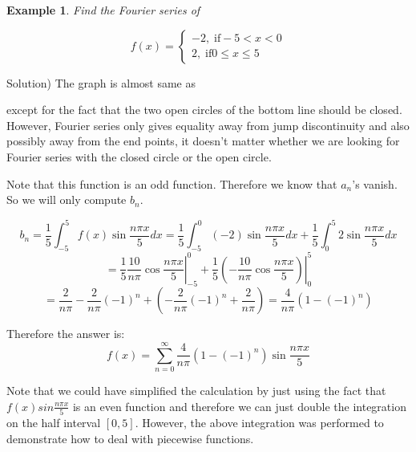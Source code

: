 \documentclass[12pt]{report}
\newtheorem{ex}{Example}[section]
\begin{document}
\begin{ex}
	Find the Fourier series of 
\end{ex}
	$$f(x) = \begin{cases} -2, \; \mathrm{ if } -5<x<0 \\ 2 , \; \mathrm{ if } 0\leq x \leq 5 \end{cases} $$

Solution)
The graph is almost same as
\begin{center}  \end{center}
except for the fact that the two open circles of the bottom line should be closed. However, Fourier series only gives equality away from jump discontinuity and also possibly away from the end points, it doesn't matter whether we are looking for Fourier series with the closed circle or the open circle. 

Note that this function is an odd function. Therefore we know that $a_n$'s vanish. So we will only compute $b_n$.

$$b_n = \frac{1}{5} \int_{-5}^{5} f(x) \sin \frac{n\pi x }{5} dx = \frac{1}{5} \int_{-5}^{0} (-2) \sin \frac{n\pi x }{5} dx + \frac{1}{5} \int_{0}^{5} 2 \sin \frac{n\pi x }{5} dx$$
$$= \frac{1}{5} \left. \frac{10}{n\pi} \cos \frac{n\pi x }{5} \right\vert_{-5}^0 + \frac{1}{5} \left. \left(-\frac{10}{n\pi} \cos \frac{n\pi x }{5} \right) \right\vert_{0}^5 $$
$$= \frac{2}{n\pi} - \frac{2}{n\pi} (-1)^n + \left(- \frac{2}{n\pi} (-1)^n +\frac{2}{n\pi} \right) = \frac{4}{n\pi} \left(1-(-1)^n\right)$$

Therefore the answer is:
$$f(x) = \sum_{n=0}^{\infty}  \frac{4}{n\pi} \left( 1-(-1)^n \right) \sin \frac{n\pi x}{5} $$

Note that we could have simplified the calculation by just using the fact that $f(x) sin \frac{n\pi x }{5}$ is an even function and therefore we can just double the integration on the half interval $[0,5]$. However, the above integration was performed to demonstrate how to deal with piecewise functions. 
\end{document}
